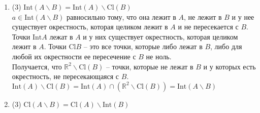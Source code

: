 \documentclass[a4paper]{article}
\def\Int{\mathrm{Int}}
\def\Cl{\mathrm{Cl}}
\begin{document}
\begin{enumerate}
\begin{enumerate}
        \item (3) $\Int (A\smallsetminus B) = \Int (A)\smallsetminus \Cl(B)$\\
        $a \in \Int (A\smallsetminus B)$ равносильно тому, что она лежит в $A$, не лежит в $B$ и у нее существует окрестность, которая целиком лежит в $A$ и не пересекается с $B$.\\
        Точки $\Int A$ лежат в $A$ и у них существует окрестность, которая целиком лежит в $A$. Точки $\Cl B$ -- это все точки, которые либо лежат в $B$, либо для любой их окрестности ее пересечение с $B$ не ноль.\\
        Получается, что $\mathbb R^2 \smallsetminus \Cl(B)$ -- точки, которые не лежат в $B$ и у которых есть окрестность, не пересекающаяся с $B$.\\
        $\Int (A)\smallsetminus \Cl(B) = \Int(A)\cap (\mathbb R^2 \smallsetminus \Cl(B)) = \Int(A\smallsetminus B)$
        \item (3) $\Cl (A\smallsetminus B) = \Cl(A)\smallsetminus \Int(B)$\\
        
        
    \end{enumerate}
    

\end{enumerate}
\end{document}
